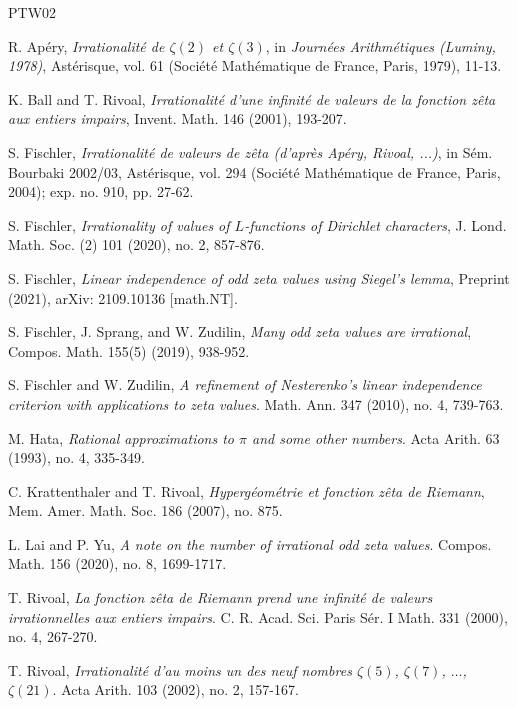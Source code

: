 \documentclass[11pt]{amsart}
\numberwithin{equation}{section}
\begin{document}
\begin{thebibliography}{PTW02}

 R. Ap{\'e}ry, \textit{Irrationalit{\'e} de $\zeta(2)$ et $\zeta(3)$}, in \textit{Journ{\'e}es Arithm{\'e}tiques (Luminy, 1978)}, Ast{\'e}risque, vol. 61 (Soci{\'e}t{\'e} Math{\'e}matique de France, Paris, 1979), 11-13.

  K. Ball and T. Rivoal, \textit{Irrationalit{\'e} d'une infinit{\'e} de valeurs de la fonction z{\^e}ta aux entiers impairs}, Invent. Math. 146 (2001), 193-207.

 S. Fischler, \textit{Irrationalit{\'e} de valeurs de z{\^e}ta (d'apr{\`e}s Ap{\'e}ry, Rivoal, ...)}, in S{\'e}m. Bourbaki 2002/03, Ast{\'e}risque, vol. 294 (Soci{\'e}t{\'e} Math{\'e}matique de France, Paris, 2004); exp. no. 910, pp. 27-62.

 S. Fischler, \textit{Irrationality of values of $L$-functions of Dirichlet characters}, J. Lond. Math. Soc. (2) 101 (2020), no. 2, 857-876.

 S. Fischler, \textit{Linear independence of odd zeta values using Siegel's lemma}, Preprint (2021), arXiv: 2109.10136 [math.NT].

  S. Fischler, J. Sprang, and W. Zudilin, \textit{Many odd zeta values are irrational}, Compos. Math. 155(5) (2019), 938-952.

 S. Fischler and W. Zudilin, \textit{A refinement of Nesterenko's linear independence criterion with applications to zeta values}. Math. Ann. 347 (2010), no. 4, 739-763.



 M. Hata, \textit{Rational approximations to $\pi$ and some other numbers}. Acta Arith. 63 (1993), no. 4, 335-349.

 C. Krattenthaler and T. Rivoal, \textit{Hyperg{\'e}om{\'e}trie et fonction z{\^e}ta de Riemann}, Mem. Amer.
Math. Soc. 186 (2007), no. 875.

 L. Lai and P. Yu, \textit{A note on the number of irrational odd zeta values}. Compos. Math. 156 (2020), no. 8, 1699-1717.

 T. Rivoal, \textit{La fonction z{\^e}ta de Riemann prend une infinit{\'e} de valeurs irrationnelles aux entiers impairs}.  C. R. Acad. Sci. Paris S{\'e}r. I Math. 331 (2000), no. 4, 267-270.

 T. Rivoal, \textit{Irrationalit{\' e} d'au moins un des neuf nombres $\zeta(5)$, $\zeta(7)$, $\ldots$, $\zeta(21)$}. Acta Arith. 103 (2002), no. 2, 157-167.


\end{thebibliography}
\end{document}

